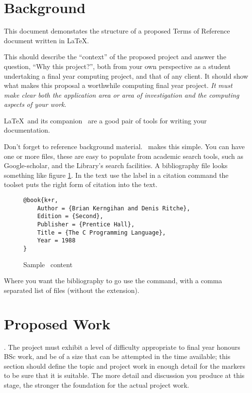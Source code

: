 
\section{Background}
This document demonstates the structure of a proposed Terms of Reference document written in \LaTeX.

This should describe the ``context'' of the proposed project and answer the question, ``Why this project?'', both from your own perspective as a student undertaking a final year computing project, and that of any client.  It should show what makes this proposal a worthwhile computing final year project.  \emph{It must make clear both the application area or area of investigation and the computing aspects of your work}.

\LaTeX\ and its companion \BibTeX\ are a good pair of tools for writing your documentation.

Don't forget to reference background material.  \BibTeX\ makes this simple.
You can have one or more  files, these are  easy to populate from academic search tools, such as Google-scholar, and the Library's search facilities.  A bibliography file looks something like figure \ref{bibtex-sample}.  In the text use the label in a citation command
	\texttt{\citep{k+r}} the toolset puts the right form of citation
	\citep[pages 2--4]{k+r} into the text.


\begin{figure}
\begin{tcolorbox}{}
\begin{verbatim}
@book{k+r,
	Author = {Brian Kerngihan and Denis Ritche},
	Edition = {Second},
	Publisher = {Prentice Hall},
	Title = {The C Programming Language},
	Year = 1988
}
\end{verbatim}
\end{tcolorbox}
\caption{Sample \BibTeX\ content}
\label{bibtex-sample}
\end{figure}

Where you want the bibliography to go use the \texttt{} command, with a comma separated list of  files (without the extension).

\section{Proposed Work}
\label{proposed}
.  The project must exhibit a level of difficulty appropriate to final year honours BSc work, and be of a size that can be attempted in the time available; this section should define the topic and project work in enough detail for the markers to be sure that it is suitable. The more detail and discussion you produce at this stage, the stronger the foundation for the actual project work.


